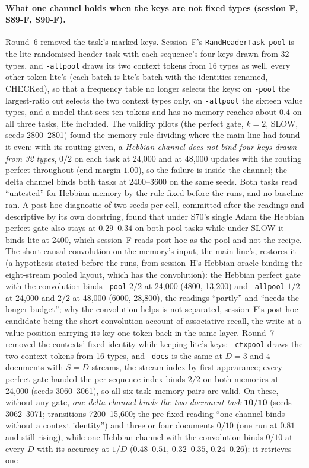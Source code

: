 \documentclass[11pt]{article}
\begin{document}
\paragraph{What one channel holds when the keys are not fixed types (session F, S89-F, S90-F).} Round~6 removed the task's marked keys. Session~F's \texttt{RandHeaderTask-pool} is the lite randomised header task with each sequence's four keys drawn from 32 types, and \texttt{-allpool} draws its two context tokens from 16 types as well, every other token lite's (each batch is lite's batch with the identities renamed, CHECKed), so that a frequency table no longer selects the keys: on \texttt{-pool} the largest-ratio cut selects the two context types only, on \texttt{-allpool} the sixteen value types, and a model that sees ten tokens and has no memory reaches about $0.4$ on all three tasks, lite included. The validity pilots (the perfect gate, $k = 2$, SLOW, seeds 2800--2801) found the memory rule dividing where the main line had found it even: with its routing given, a \emph{Hebbian channel does not bind four keys drawn from 32 types}, $0/2$ on each task at 24{,}000 and at 48{,}000 updates with the routing perfect throughout (end margin $1.00$), so the failure is inside the channel; the delta channel binds both tasks at 2400--3600 on the same seeds. Both tasks read ``untested'' for Hebbian memory by the rule fixed before the runs, and no baseline ran. A post-hoc diagnostic of two seeds per cell, committed after the readings and descriptive by its own docstring, found that under S70's single Adam the Hebbian perfect gate also stays at $0.29$--$0.34$ on both pool tasks while under SLOW it binds lite at 2400, which session~F reads post hoc as the pool and not the recipe. The short causal convolution on the memory's input, the main line's, restores it (a hypothesis stated before the runs, from session~H's Hebbian oracle binding the eight-stream pooled layout, which has the convolution): the Hebbian perfect gate with the convolution binds \texttt{-pool} $2/2$ at 24{,}000 (4800, 13{,}200) and \texttt{-allpool} $1/2$ at 24{,}000 and $2/2$ at 48{,}000 (6000, 28{,}800), the readings ``partly'' and ``needs the longer budget''; why the convolution helps is not separated, session~F's post-hoc candidate being the short-convolution account of associative recall, the write at a value position carrying its key one token back in the same layer. Round~7 removed the contexts' fixed identity while keeping lite's keys: \texttt{-ctxpool} draws the two context tokens from 16 types, and \texttt{-docs} is the same at $D = 3$ and $4$ documents with $S = D$ streams, the stream index by first appearance; every perfect gate handed the per-sequence index binds $2/2$ on both memories at 24{,}000 (seeds 3060--3061), so all six task--memory pairs are valid. On these, without any gate, \emph{one delta channel binds the two-document task} $\mathbf{10/10}$ (seeds 3062--3071; transitions 7200--15{,}600; the pre-fixed reading ``one channel binds without a context identity'') and three or four documents $0/10$ (one run at $0.81$ and still rising), while one Hebbian channel with the convolution binds $0/10$ at every $D$ with its accuracy at $1/D$ ($0.48$--$0.51$, $0.32$--$0.35$, $0.24$--$0.26$): it retrieves one 
\end{document}
